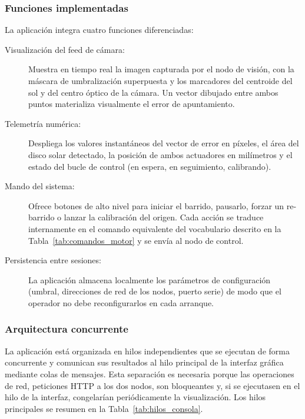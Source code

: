 \subsubsection{Funciones implementadas}
La aplicación integra cuatro funciones diferenciadas:

\begin{description}
	\item[Visualización del feed de cámara:] Muestra en tiempo real la 	imagen capturada por el nodo de visión, con la máscara de 				umbralización superpuesta y los marcadores del centroide del sol y 	del centro óptico de la cámara. Un vector dibujado entre ambos 			puntos materializa visualmente el error de apuntamiento.

	\item[Telemetría numérica:] Despliega los valores instantáneos del 
    vector de error en píxeles, el área del disco solar detectado, la 
    posición de ambos actuadores en milímetros y el estado del bucle 
    de control (en espera, en seguimiento, calibrando).
    
    \item[Mando del sistema:] Ofrece botones de alto nivel para 
    iniciar el barrido, pausarlo, forzar un re-barrido o lanzar la 
    calibración del origen. Cada acción se traduce internamente en el 
    comando equivalente del vocabulario descrito en la 
    Tabla~\ref{tab:comandos_motor} y se envía al nodo de control.
    
    \item[Persistencia entre sesiones:] La aplicación almacena 
    localmente los parámetros de configuración (umbral, direcciones 
    de red de los nodos, puerto serie) de modo que el operador no 
    debe reconfigurarlos en cada arranque.
\end{description}

\subsubsection{Arquitectura concurrente}

La aplicación está organizada en hilos independientes que se ejecutan de forma concurrente y comunican sus resultados al hilo principal de la interfaz gráfica mediante colas de mensajes. Esta separación es necesaria porque las operaciones de red, peticiones HTTP a los dos nodos, son bloqueantes y, si se ejecutasen en el hilo de la interfaz, congelarían periódicamente la visualización. Los hilos principales se resumen en la Tabla~\ref{tab:hilos_consola}.

